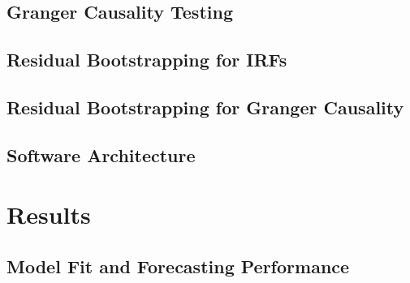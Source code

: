 \documentclass[11pt]{article}
\begin{document}
\subsection{Granger Causality Testing}

\subsection{Residual Bootstrapping for IRFs}

\subsection{Residual Bootstrapping for Granger Causality}

\subsection{Software Architecture}

\section{Results}

\subsection{Model Fit and Forecasting Performance}
\end{document}
